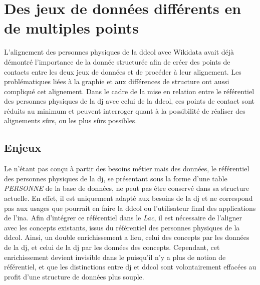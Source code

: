\section{\label{III-C-1}Des jeux de données différents en de multiples points}

L'alignement des personnes physiques de la \ac{ddcol} avec Wikidata avait déjà démontré l'importance de la donnée structurée afin de créer des points de contacts entre les deux jeux de données et de procéder à leur alignement. Les problématiques liées à la graphie et aux différences de structure ont aussi compliqué cet alignement. Dans le cadre de la mise en relation entre le référentiel des personnes physiques de la \ac{dj} avec celui de la \ac{ddcol}, ces points de contact sont réduits au minimum et peuvent interroger quant à la possibilité de réaliser des alignements sûrs, ou les plus sûrs possibles.

\subsection{\label{III-C-1-a}Enjeux}

Le \ldd n'étant pas conçu à partir des besoins métier mais des données, le référentiel des personnes physiques de la \ac{dj}, se présentant sous la forme d'une table \textit{PERSONNE} de la base de données, ne peut pas être conservé dans sa structure actuelle. En effet, il est uniquement adapté aux besoins de la \ac{dj} et ne correspond pas aux usages que pourrait en faire la \ac{ddcol} ou l'utilisateur final des applications de l'\ac{ina}. Afin d'intégrer ce référentiel dans le \textit{Lac}, il est nécessaire de l'aligner avec les concepts existants, issus du référentiel des personnes physiques de la \ac{ddcol}. Ainsi, un double enrichissement a lieu, celui des concepts par les données de la \ac{dj}, et celui de la \ac{dj} par les données des concepts. Cependant, cet enrichissement devient invisible dans le \ldd puisqu'il n'y a plus de notion de référentiel, et que les distinctions entre \ac{dj} et \ac{ddcol} sont volontairement effacées au profit d'une structure de données plus souple.\\

